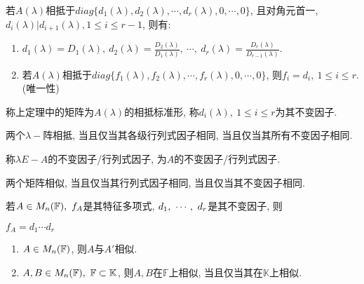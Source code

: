 \begin{theorem}[行列式因子与不变因子]
    若$A(\lambda)$相抵于$diag\{d_1(\lambda),d_2(\lambda),\cdots,d_r(\lambda),0,\cdots,0\}$, 且对角元首一, $d_i(\lambda)|d_{i+1}(\lambda), 1\le i \le r-1$,
    则有:\par
    \begin{enumerate}[itemindent=1em]
        \item $d_1(\lambda)=D_1(\lambda),\ d_2(\lambda)=\frac{D_2(\lambda)}{D_1(\lambda)},\ \cdots,\ d_r(\lambda)=\frac{D_r(\lambda)}{D_{r-1}(\lambda)}$.
        \item 若$A(\lambda)$相抵于$diag\{f_1(\lambda),f_2(\lambda),\cdots,f_r(\lambda),0,\cdots,0\}$, 则$f_i=d_i,\ 1\le i \le r$.(唯一性)
    \end{enumerate}
\end{theorem}

\begin{definition}[smith标准形]
    称上定理中的矩阵为$A(\lambda)$的相抵标准形, 称$d_i(\lambda),\ 1\le i \le r$为其不变因子.
\end{definition}

\begin{inference}
    两个$\lambda-$阵相抵, 当且仅当其各级行列式因子相同, 当且仅当其所有不变因子相同.
\end{inference}

\begin{definition}[行列式因子与不变因子]
    称$\lambda E-A$的不变因子/行列式因子, 为$A$的不变因子/行列式因子.
\end{definition}

\begin{theorem}[矩阵相似的充要条件]
    两个矩阵相似, 当且仅当其行列式因子相同, 当且仅当其不变因子相同.
\end{theorem}

\begin{example}
    若$A\in M_{n}(\mathbb{F}),\ f_A$是其特征多项式, ${d}{_1},\ \cdots,\ {d}{_{r}}$是其不变因子, 则\par
    $f_A=d_1\cdots d_r$
\end{example}

\begin{inference}
    \par
    \begin{enumerate}[itemindent=1em]
        \item $A\in M_{n}(\mathbb{F})$, 则$A$与$A'$相似.
        \item $A,B\in M_{n}(\mathbb{F}),\ \mathbb{F}\subset \mathbb{K}$, 则$A,B$在$\mathbb{F}$上相似, 当且仅当其在$\mathbb{K}$上相似.
    \end{enumerate}
\end{inference}

